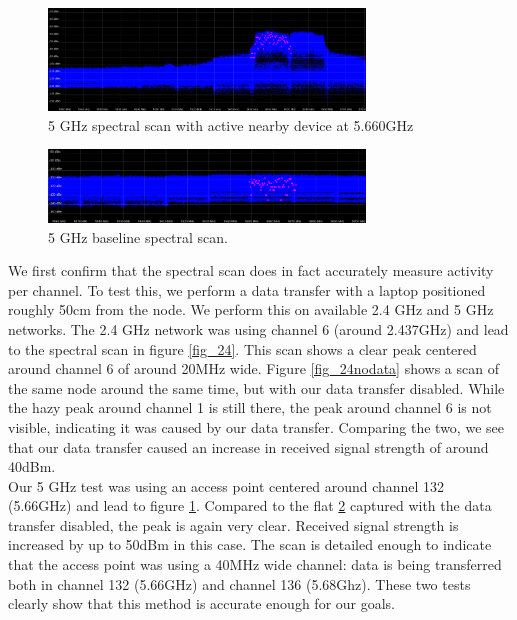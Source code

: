 \documentclass[a4paper, 11pt]{article}
\begin{document}
\begin{figure}[ht]
\centering
\includegraphics[width=0.75\textwidth]{50check.png}
\caption{5 GHz spectral scan with active nearby device at 5.660GHz}
\label{fig_50}
\end{figure}

\begin{figure}[ht]
\centering
\includegraphics[width=0.75\textwidth]{50check_nodata.png}
\caption{5 GHz baseline spectral scan.}
\label{fig_50nodata}
\end{figure}
We first confirm that the spectral scan does in fact accurately measure activity per channel. To test this, we perform a data transfer with a laptop positioned roughly 50cm from the node. We perform this on available 2.4 GHz and 5 GHz networks. The 2.4 GHz network was using channel 6 (around 2.437GHz) and lead to the spectral scan in figure \ref{fig_24}. This scan shows a clear peak centered around channel 6 of around 20MHz wide. Figure \ref{fig_24nodata} shows a scan of the same node around the same time, but with our data transfer disabled. While the hazy peak around channel 1 is still there, the peak around channel 6 is not visible, indicating it was caused by our data transfer. Comparing the two, we see that our data transfer caused an increase in received signal strength of around 40dBm.\\ Our 5 GHz test was using an access point centered around channel 132 (5.66GHz) and lead to figure \ref{fig_50}. Compared to the flat \ref{fig_50nodata} captured with the data transfer disabled, the peak is again very clear. Received signal strength is increased by up to 50dBm in this case. The scan is detailed enough to indicate that the access point was using a 40MHz wide channel: data is being transferred both in channel 132 (5.66GHz) and channel 136 (5.68Ghz). These two tests clearly show that this method is accurate enough for our goals.
\end{document}
